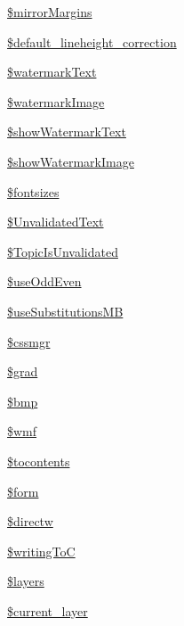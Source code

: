 \begin{DoxyCompactItemize}
\item 
\hyperlink{classm_p_d_f_ad0582b2bc47f919ae419b3ce52679287}{\$mirror\-Margins}
\item 
\hyperlink{classm_p_d_f_a1beb74e1d56f4b8ce2d02aca572d1bf7}{\$default\-\_\-lineheight\-\_\-correction}
\item 
\hyperlink{classm_p_d_f_a8deb2383371af358077a3ae13aa5c74e}{\$watermark\-Text}
\item 
\hyperlink{classm_p_d_f_a7e89056334c3f65ca64a3cc80f156d5d}{\$watermark\-Image}
\item 
\hyperlink{classm_p_d_f_ab657bc01184ea995a19160dc40bfdb10}{\$show\-Watermark\-Text}
\item 
\hyperlink{classm_p_d_f_a53c3aa13e58cedf93e63400d6e596666}{\$show\-Watermark\-Image}
\item 
\hyperlink{classm_p_d_f_ad6aa3461608322604e993c1d6ee9d142}{\$fontsizes}
\item 
\hyperlink{classm_p_d_f_a529e7530233ff3505dba95f3237e29e1}{\$\-Unvalidated\-Text}
\item 
\hyperlink{classm_p_d_f_af4dbb0ab9e250ef97ce69fcff51d3dad}{\$\-Topic\-Is\-Unvalidated}
\item 
\hyperlink{classm_p_d_f_ab13050dd399adb9df8822ce953856a51}{\$use\-Odd\-Even}
\item 
\hyperlink{classm_p_d_f_a01d684e2711849f2c592ba34cc22ee0b}{\$use\-Substitutions\-M\-B}
\item 
\hyperlink{classm_p_d_f_ac57042abadacc8f32da9b2797e008f61}{\$cssmgr}
\item 
\hyperlink{classm_p_d_f_a6880c8c979b2fad841acbe2590a0038f}{\$grad}
\item 
\hyperlink{classm_p_d_f_aacb7ce25a9d09e7bf52c9fde4be20a49}{\$bmp}
\item 
\hyperlink{classm_p_d_f_aded5d1a3023505e308ae36db6d961ba0}{\$wmf}
\item 
\hyperlink{classm_p_d_f_ae64feec2722153ef89706333bab5f405}{\$tocontents}
\item 
\hyperlink{classm_p_d_f_a0c3fadbb6af46f5b6967e1a46138771d}{\$form}
\item 
\hyperlink{classm_p_d_f_a2a098e5ccf32f4c9831f449627755789}{\$directw}
\item 
\hyperlink{classm_p_d_f_a24102469f1891912d16b74c02cf95d5a}{\$writing\-To\-C}
\item 
\hyperlink{classm_p_d_f_a5e04c8648db6ac562c02f5add409b719}{\$layers}
\item 
\hyperlink{classm_p_d_f_a9ab63038434f4edc1e18ddef8c3a235c}{\$current\-\_\-layer}

\end{DoxyCompactItemize}
